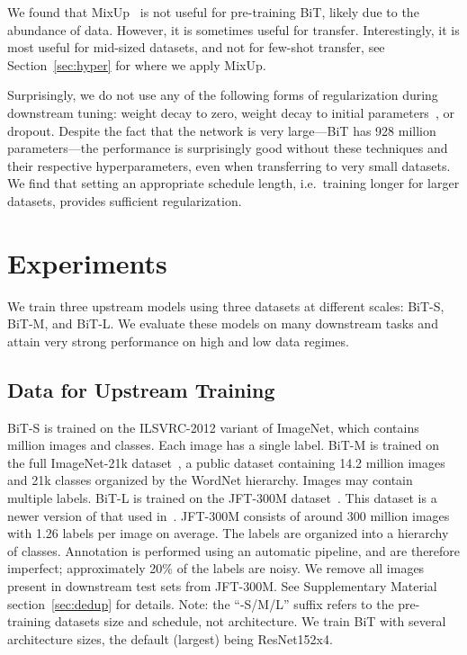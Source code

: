 \documentclass[runningheads]{llncs}
\newcommand{\name}{{BiT}}
\newcommand{\imagenet}{{ILSVRC-2012}}
\begin{document}
We found that MixUp~\cite{mixup} is not useful for pre-training \name{}, likely due to the abundance of data.
However, it is sometimes useful for transfer.
Interestingly, it is most useful for mid-sized datasets, and not for few-shot transfer, see Section~\ref{sec:hyper} for where we apply MixUp.

Surprisingly, we do not use any of the following forms of regularization during downstream tuning: weight decay to zero, weight decay to initial parameters~\cite{li2018explicit}, or dropout. Despite the fact that the network is very large---\name{} has 928 million parameters---the performance is surprisingly good without these techniques and their respective hyperparameters, even when transferring to very small datasets.
We find that setting an appropriate schedule length, i.e.\ training longer for larger datasets, provides sufficient regularization.

\section{Experiments}

We train three upstream models using three datasets at different scales: \name{}-S, \name{}-M, and \name{}-L.
We evaluate these models on many downstream tasks and attain very strong performance on high and low data regimes.

\subsection{Data for Upstream Training}
\name{}-S is trained on the \imagenet{} variant of ImageNet, which contains  million images and  classes.
Each image has a single label. 
\name{}-M is trained on the full ImageNet-21k dataset~\cite{deng2009imagenet}, a public dataset containing 14.2 million images and 21k classes organized by the WordNet hierarchy.
Images may contain multiple labels.
\name{}-L is trained on the JFT-300M dataset~\cite{sun2017revisiting,dat,noisystudent}.
This dataset is a newer version of that used in~\cite{hinton2015distilling,chollet2017xception}.
JFT-300M consists of around 300 million images with 1.26 labels per image on average.
The labels are organized into a hierarchy of  classes.
Annotation is performed using an automatic pipeline, and are therefore imperfect; approximately 20\% of the labels are noisy.
We remove all images present in downstream test sets from JFT-300M. See Supplementary Material section~\ref{sec:dedup} for details.
Note: the ``-S/M/L'' suffix refers to the pre-training datasets size and schedule, not architecture. We train \name{} with several architecture sizes, the default (largest) being ResNet152x4.
\end{document}
